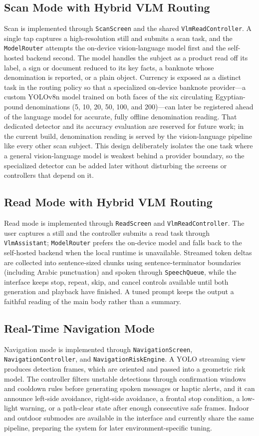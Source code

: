 \documentclass[a4paper]{report}
\begin{document}
\subsection{Scan Mode with Hybrid VLM Routing}
Scan is implemented through \texttt{ScanScreen} and the shared \texttt{VlmReadController}. A single tap captures a high-resolution still and submits a scan task, and the \texttt{ModelRouter} attempts the on-device vision-language model first and the self-hosted backend second. The model handles the subject as a product read off its label, a sign or document reduced to its key facts, a banknote whose denomination is reported, or a plain object. Currency is exposed as a distinct task in the routing policy so that a specialized on-device banknote provider---a custom YOLOv8n model trained on both faces of the six circulating Egyptian-pound denominations (5, 10, 20, 50, 100, and 200)---can later be registered ahead of the language model for accurate, fully offline denomination reading. That dedicated detector and its accuracy evaluation are reserved for future work; in the current build, denomination reading is served by the vision-language pipeline like every other scan subject. This design deliberately isolates the one task where a general vision-language model is weakest behind a provider boundary, so the specialized detector can be added later without disturbing the screens or controllers that depend on it.

\subsection{Read Mode with Hybrid VLM Routing}
Read mode is implemented through \texttt{ReadScreen} and \texttt{VlmReadController}. The user captures a still and the controller submits a read task through \texttt{VlmAssistant}; \texttt{ModelRouter} prefers the on-device model and falls back to the self-hosted backend when the local runtime is unavailable. Streamed token deltas are collected into sentence-sized chunks using sentence-terminator boundaries (including Arabic punctuation) and spoken through \texttt{SpeechQueue}, while the interface keeps stop, repeat, skip, and cancel controls available until both generation and playback have finished. A tuned prompt keeps the output a faithful reading of the main body rather than a summary.

\subsection{Real-Time Navigation Mode}
Navigation mode is implemented through \texttt{NavigationScreen}, \texttt{NavigationController}, and \texttt{NavigationRiskEngine}. A YOLO streaming view produces detection frames, which are oriented and passed into a geometric risk model. The controller filters unstable detections through confirmation windows and cooldown rules before generating spoken messages or haptic alerts, and it can announce left-side avoidance, right-side avoidance, a frontal stop condition, a low-light warning, or a path-clear state after enough consecutive safe frames. Indoor and outdoor submodes are available in the interface and currently share the same pipeline, preparing the system for later environment-specific tuning.
\end{document}
